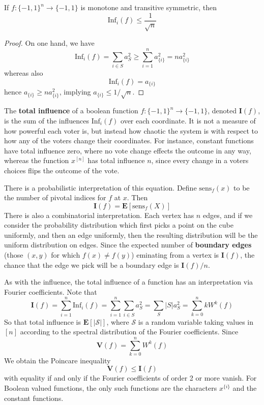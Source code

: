 \begin{theorem}
    If $f: \{ -1, 1 \}^n \to \{ -1, 1 \}$ is monotone and transitive symmetric, then
    \[ \text{Inf}_i(f) \leq \frac{1}{\sqrt{n}} \]
\end{theorem}
\begin{proof}
    On one hand, we have
    \[ \text{Inf}_i(f) = \sum_{i \in S} a_S^2 \geq \sum_{i = 1}^n a_{\{i\}}^2 = n a_{\{i\}}^2 \]
    whereas also
    \[ \text{Inf}_i(f) = a_{\{i\}} \]
    hence $a_{\{i\}} \geq n a_{\{i\}}^2$, implying $a_{\{i\}} \leq 1/\sqrt{n}$.
\end{proof}

The {\bf total influence} of a boolean function $f: \{ -1, 1 \}^n \to \{ -1, 1 \}$, denoted $\mathbf{I}(f)$, is the sum of the influences $\text{Inf}_i(f)$ over each coordinate. It is not a measure of how powerful each voter is, but instead how chaotic the system is with respect to how any of the voters change their coordinates. For instance, constant functions have total influence zero, where no vote change effects the outcome in any way, whereas the function $x^{[n]}$ has total influence $n$, since every change in a voters choices flips the outcome of the vote. 

There is a probabilistic interpretation of this equation. Define $\text{sens}_f(x)$ to be the number of pivotal indices for $f$ at $x$. Then
%
\[ \mathbf{I}(f) = \mathbf{E}[\text{sens}_f(X)] \]
%
There is also a combinatorial interpretation. Each vertex has $n$ edges, and if we consider the probability distribution which first picks a point on the cube uniformly, and then an edge uniformly, then the resulting distribution will be the uniform distribution on edges. Since the expected number of {\bf boundary edges} (those $(x,y)$ for which $f(x) \neq f(y)$) eminating from a vertex is $\mathbf{I}(f)$, the chance that the edge we pick will be a boundary edge is $\mathbf{I}(f)/n$.

As with the influence, the total influence of a function has an interpretation via Fourier coefficients. Note that
%
\[ \mathbf{I}(f) = \sum_{i = 1}^n \text{Inf}_i(f) = \sum_{i = 1}^n \sum_{i \in S} a_S^2 = \sum_S |S| a_S^2 = \sum_{k = 0}^n k W^k (f) \]
%
So that total influence is $\mathbf{E}[|\mathcal{S}|]$, where $\mathcal{S}$ is a random variable taking values in $[n]$ according to the spectral distribution of the Fourier coefficients. Since
%
\[ \mathbf{V}(f) = \sum_{k = 0}^n W^k(f) \]
%
We obtain the Poincare inequality
%
\[ \mathbf{V}(f) \leq \mathbf{I}(f) \]
%
with equality if and only if the Fourier coefficients of order 2 or more vanish. For Boolean valued functions, the only such functions are the characters $x^{\{i\}}$ and the constant functions.

